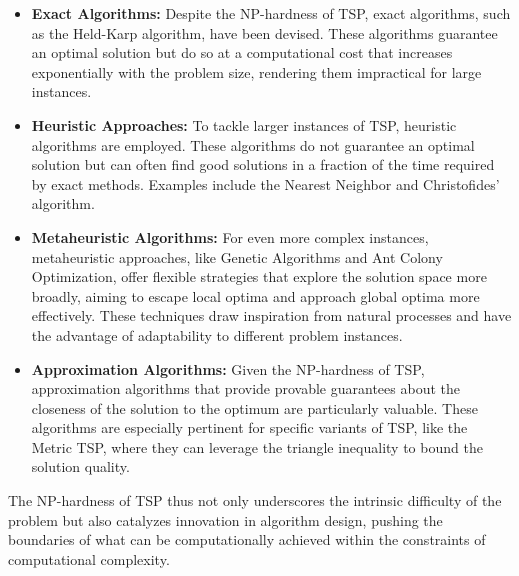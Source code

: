 \begin{itemize}
    \item \textbf{Exact Algorithms:} Despite the NP-hardness of TSP, exact algorithms, such as the Held-Karp algorithm, have been devised. These algorithms guarantee an optimal solution but do so at a computational cost that increases exponentially with the problem size, rendering them impractical for large instances.
    \item \textbf{Heuristic Approaches:} To tackle larger instances of TSP, heuristic algorithms are employed. These algorithms do not guarantee an optimal solution but can often find good solutions in a fraction of the time required by exact methods. Examples include the Nearest Neighbor and Christofides' algorithm.
    \item \textbf{Metaheuristic Algorithms:} For even more complex instances, metaheuristic approaches, like Genetic Algorithms and Ant Colony Optimization, offer flexible strategies that explore the solution space more broadly, aiming to escape local optima and approach global optima more effectively. These techniques draw inspiration from natural processes and have the advantage of adaptability to different problem instances.
    \item \textbf{Approximation Algorithms:} Given the NP-hardness of TSP, approximation algorithms that provide provable guarantees about the closeness of the solution to the optimum are particularly valuable. These algorithms are especially pertinent for specific variants of TSP, like the Metric TSP, where they can leverage the triangle inequality to bound the solution quality.
\end{itemize}

The NP-hardness of TSP thus not only underscores the intrinsic difficulty of the problem but also catalyzes innovation in algorithm design, pushing the boundaries of what can be computationally achieved within the constraints of computational complexity.


